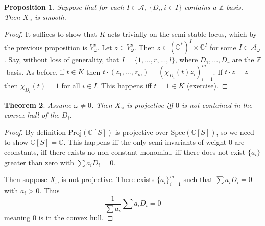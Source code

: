 \documentclass{article}
\newtheorem{theorem}{Theorem}
\newtheorem{prop}[theorem]{Proposition}
\theoremstyle{definition}
\theoremstyle{remark}
\numberwithin{theorem}{section}
\newcommand{\C}{\mathbb{C}}
\newcommand{\Z}{\mathbb{Z}}
\newcommand{\Spec}{\text{Spec}}
\newcommand{\Proj}{\text{Proj}}
\newenvironment{thm}{
\begin{mdframed}
	\vspace{-0.5em}
	\begin{theorem}
}{
	\end{theorem}
\end{mdframed}
}
\begin{document}
	\begin{prop}
		Suppose that for each $I \in \mathcal{A}$, $\{D_i, i\in I\}$ contains a $\Z$-basis. Then $X_\omega$ is smooth.
	\end{prop}
	\begin{proof}
		It suffices to show that $K$ acts trivially on the semi-stable locus, which by the previous proposition is $V^s_\omega$. Let $z\in V^s_\omega$. Then $z\in (\C^\ast)^I\times \C^{\overline{I}}$ for some $I\in\mathcal{A}_\omega$. Say, without loss of generality, that $I=\{1,...,r,...,l\}$, where $D_1,...,D_r$ are the $\Z$-basis. As before, if $t\in K$ then $t\cdot (z_1,...,z_m) = (\chi_{D_i}(t)z_i)_{i=1}^m$. If $t\cdot z = z$ then $\chi_{D_i}(t)=1$ for all $i\in I$. This happens iff $t=1\in K$ (exercise). 
	\end{proof}
	\begin{thm}
		Assume $\omega \neq 0$. Then $X_\omega$ is projective iff $0$ is not contained in the convex hull of the $D_i$.
	\end{thm}
	\begin{proof}
		By definition $\Proj(\C[S])$ is projective over $\Spec(\C[S])$, so we need to show $\C[S]=\C$. This happens iff the only semi-invariants of weight $0$ are cconstants, iff there exists no non-constant monomial, iff there does not exist $\{a_i\}$ greater than zero with $\sum a_i D_i = 0$. \vspace*{1em}
		
		Then suppose $X_\omega$ is not projective. There exists $\{a_i\}^m_{i=1}$ such that $\sum a_i D_i =0$ with $a_i>0$. Thus 
		$$\frac{1}{\sum a_i} \sum a_i D_i = 0$$
		meaning $0$ is in the convex hull.
	\end{proof}
\end{document}
